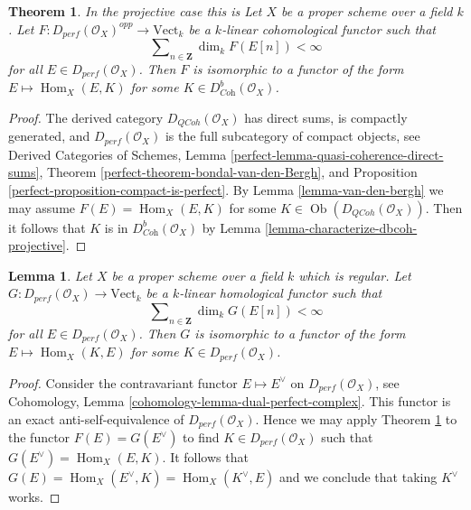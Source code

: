 \documentclass{stacks-project}
\newenvironment{reference}{\comment}{\endcomment}
\theoremstyle{plain}
\newtheorem{theorem}[subsection]{Theorem}
\newtheorem{lemma}[subsection]{Lemma}
\theoremstyle{definition}
\theoremstyle{remark}
\numberwithin{equation}{subsection}
\def\Hom{\mathop{\mathrm{Hom}}\nolimits}
\def\Ob{\mathop{\mathrm{Ob}}\nolimits}
\def\QCoh{\mathit{QCoh}}
\begin{document}
\begin{theorem}
\label{theorem-bondal-van-den-bergh}
\begin{reference}
In the projective case this is \cite[Theorem A.1]{BvdB}
\end{reference}
Let $X$ be a proper scheme over a field $k$.
Let $F : D_{perf}(\mathcal{O}_X)^{opp} \to \text{Vect}_k$
be a $k$-linear cohomological functor such that
$$
\sum\nolimits_{n \in \mathbf{Z}} \dim_k F(E[n]) < \infty
$$
for all $E \in D_{perf}(\mathcal{O}_X)$. Then $F$ is isomorphic to a functor
of the form $E \mapsto \Hom_X(E, K)$ for some
$K \in D^b_{\textit{Coh}}(\mathcal{O}_X)$.
\end{theorem}

\begin{proof}
The derived category $D_\QCoh(\mathcal{O}_X)$ has direct sums,
is compactly generated, and $D_{perf}(\mathcal{O}_X)$ is the full subcategory
of compact objects, see
Derived Categories of Schemes, Lemma
\ref{perfect-lemma-quasi-coherence-direct-sums},
Theorem \ref{perfect-theorem-bondal-van-den-Bergh}, and
Proposition \ref{perfect-proposition-compact-is-perfect}.
By Lemma \ref{lemma-van-den-bergh} we may assume
$F(E) = \Hom_X(E, K)$ for some $K \in \Ob(D_\QCoh(\mathcal{O}_X))$.
Then it follows that $K$ is in $D^b_{\textit{Coh}}(\mathcal{O}_X)$
by Lemma \ref{lemma-characterize-dbcoh-projective}.
\end{proof}

\begin{lemma}
\label{lemma-homological-representable}
Let $X$ be a proper scheme over a field $k$ which is regular.
Let $G : D_{perf}(\mathcal{O}_X) \to \text{Vect}_k$
be a $k$-linear homological functor such that
$$
\sum\nolimits_{n \in \mathbf{Z}} \dim_k G(E[n]) < \infty
$$
for all $E \in D_{perf}(\mathcal{O}_X)$. Then $G$ is isomorphic to a functor
of the form $E \mapsto \Hom_X(K, E)$ for some $K \in D_{perf}(\mathcal{O}_X)$.
\end{lemma}

\begin{proof}
Consider the contravariant functor $E \mapsto E^\vee$
on $D_{perf}(\mathcal{O}_X)$, see
Cohomology, Lemma \ref{cohomology-lemma-dual-perfect-complex}.
This functor is an exact anti-self-equivalence of $D_{perf}(\mathcal{O}_X)$.
Hence we may apply Theorem \ref{theorem-bondal-van-den-bergh}
to the functor $F(E) = G(E^\vee)$ to find
$K \in D_{perf}(\mathcal{O}_X)$ such that $G(E^\vee) = \Hom_X(E, K)$.
It follows that $G(E) = \Hom_X(E^\vee, K) = \Hom_X(K^\vee, E)$
and we conclude that taking $K^\vee$ works.
\end{proof}
\end{document}
